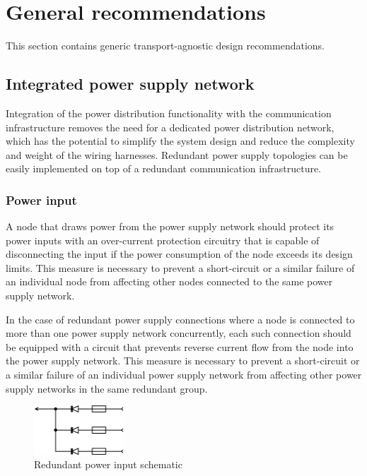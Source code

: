 \section{General recommendations}

This section contains generic transport-agnostic design recommendations.

\subsection{Integrated power supply network}\label{sec:physical_integrated_power}

Integration of the power distribution functionality with the communication infrastructure
removes the need for a dedicated power distribution network,
which has the potential to simplify the system design and reduce the complexity and weight of the wiring harnesses.
Redundant power supply topologies can be easily implemented on top of a redundant communication infrastructure.

\subsubsection{Power input}

A node that draws power from the power supply network should protect its power inputs
with an over-current protection circuitry that is capable of disconnecting the input
if the power consumption of the node exceeds its design limits.
This measure is necessary to prevent a short-circuit or a similar failure of an individual node from affecting
other nodes connected to the same power supply network.

In the case of redundant power supply connections where a node is connected to more than one power supply network
concurrently, each such connection should be equipped with a circuit that prevents reverse current flow
from the node into the power supply network.
This measure is necessary to prevent a short-circuit or a similar failure of an individual power supply network
from affecting other power supply networks in the same redundant group.

\begin{figure}[H]
    \centering
	\includegraphics[width=0.3\textwidth]{physical/redundant_power_sink}
	\caption{Redundant power input schematic}
\end{figure}

